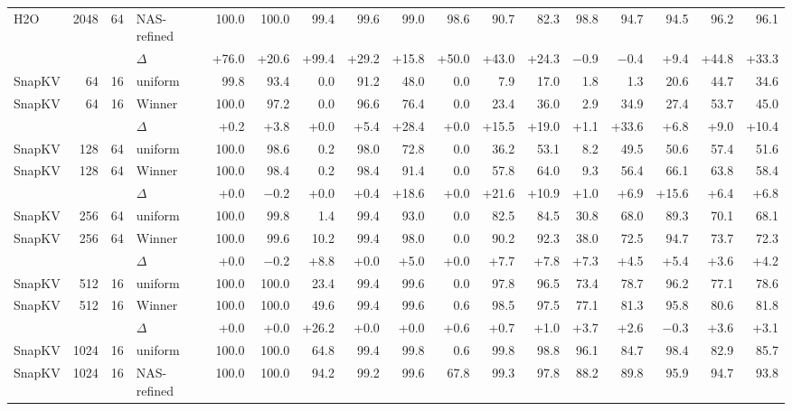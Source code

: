 \begin{table}[t]
\begin{tabular}{@{}l r r l r r r r r r r r r r r r r @{}}
    H2O & 2048 & 64 & NAS-refined & 100.0 & 100.0 & 99.4 & 99.6 & 99.0 & 98.6 & 90.7 & 82.3 & 98.8 & 94.7 & 94.5 & 96.2 & 96.1 \\
     &  &  & $\Delta$ & +76.0 & +20.6 & +99.4 & +29.2 & +15.8 & +50.0 & +43.0 & +24.3 & $-$0.9 & $-$0.4 & +9.4 & +44.8 & +33.3 \\
    \midrule
    SnapKV & 64 & 16 & uniform & 99.8 & 93.4 & 0.0 & 91.2 & 48.0 & 0.0 & 7.9 & 17.0 & 1.8 & 1.3 & 20.6 & 44.7 & 34.6 \\
    SnapKV & 64 & 16 & Winner & 100.0 & 97.2 & 0.0 & 96.6 & 76.4 & 0.0 & 23.4 & 36.0 & 2.9 & 34.9 & 27.4 & 53.7 & 45.0 \\
     &  &  & $\Delta$ & +0.2 & +3.8 & +0.0 & +5.4 & +28.4 & +0.0 & +15.5 & +19.0 & +1.1 & +33.6 & +6.8 & +9.0 & +10.4 \\
    \midrule
    SnapKV & 128 & 64 & uniform & 100.0 & 98.6 & 0.2 & 98.0 & 72.8 & 0.0 & 36.2 & 53.1 & 8.2 & 49.5 & 50.6 & 57.4 & 51.6 \\
    SnapKV & 128 & 64 & Winner & 100.0 & 98.4 & 0.2 & 98.4 & 91.4 & 0.0 & 57.8 & 64.0 & 9.3 & 56.4 & 66.1 & 63.8 & 58.4 \\
     &  &  & $\Delta$ & +0.0 & $-$0.2 & +0.0 & +0.4 & +18.6 & +0.0 & +21.6 & +10.9 & +1.0 & +6.9 & +15.6 & +6.4 & +6.8 \\
    \midrule
    SnapKV & 256 & 64 & uniform & 100.0 & 99.8 & 1.4 & 99.4 & 93.0 & 0.0 & 82.5 & 84.5 & 30.8 & 68.0 & 89.3 & 70.1 & 68.1 \\
    SnapKV & 256 & 64 & Winner & 100.0 & 99.6 & 10.2 & 99.4 & 98.0 & 0.0 & 90.2 & 92.3 & 38.0 & 72.5 & 94.7 & 73.7 & 72.3 \\
     &  &  & $\Delta$ & +0.0 & $-$0.2 & +8.8 & +0.0 & +5.0 & +0.0 & +7.7 & +7.8 & +7.3 & +4.5 & +5.4 & +3.6 & +4.2 \\
    \midrule
    SnapKV & 512 & 16 & uniform & 100.0 & 100.0 & 23.4 & 99.4 & 99.6 & 0.0 & 97.8 & 96.5 & 73.4 & 78.7 & 96.2 & 77.1 & 78.6 \\
    SnapKV & 512 & 16 & Winner & 100.0 & 100.0 & 49.6 & 99.4 & 99.6 & 0.6 & 98.5 & 97.5 & 77.1 & 81.3 & 95.8 & 80.6 & 81.8 \\
     &  &  & $\Delta$ & +0.0 & +0.0 & +26.2 & +0.0 & +0.0 & +0.6 & +0.7 & +1.0 & +3.7 & +2.6 & $-$0.3 & +3.6 & +3.1 \\
    \midrule
    SnapKV & 1024 & 16 & uniform & 100.0 & 100.0 & 64.8 & 99.4 & 99.8 & 0.6 & 99.8 & 98.8 & 96.1 & 84.7 & 98.4 & 82.9 & 85.7 \\
    SnapKV & 1024 & 16 & NAS-refined & 100.0 & 100.0 & 94.2 & 99.2 & 99.6 & 67.8 & 99.3 & 97.8 & 88.2 & 89.8 & 95.9 & 94.7 & 93.8 \\

\end{tabular}
\end{table}
